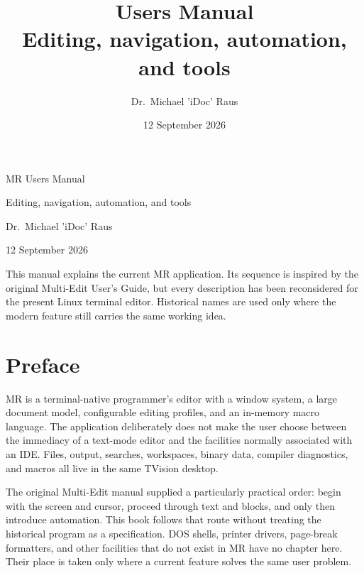 \documentclass[a4paper,10pt,twoside,openany]{book}
\title{\mr{} Users Manual\\\large Editing, navigation, automation, and tools}
\author{Dr.\ Michael 'iDoc' Raus}
\date{12 September 2026}
\newcommand{\mr}{\textsc{MR}}
\begin{document}
\frontmatter

\begin{titlepage}
\begin{center}
\vspace*{\fill}
{\LARGE \mr{} Users Manual\par}
\vspace{0.5\baselineskip}
{\large Editing, navigation, automation, and tools\par}
\vspace{3\baselineskip}
{\large Dr.\ Michael 'iDoc' Raus\par}
\vspace{2\baselineskip}
{\large 12 September 2026\par}
\end{center}

\vfill
\begin{minipage}{0.82\textwidth}
\small
This manual explains the current \mr{} application. Its sequence is inspired
by the original Multi-Edit User's Guide, but every description has been
reconsidered for the present Linux terminal editor. Historical names are used
only where the modern feature still carries the same working idea.
\end{minipage}
\vspace*{1.5cm}
\end{titlepage}

\chapter*{Preface}

\mr{} is a terminal-native programmer's editor with a window system, a large
document model, configurable editing profiles, and an in-memory macro
language. The application deliberately does not make the user choose between
the immediacy of a text-mode editor and the facilities normally associated
with an IDE. Files, output, searches, workspaces, binary data, compiler
diagnostics, and macros all live in the same TVision desktop.

The original Multi-Edit manual supplied a particularly practical order: begin
with the screen and cursor, proceed through text and blocks, and only then
introduce automation. This book follows that route without treating the
historical program as a specification. DOS shells, printer drivers, page-break
formatters, and other facilities that do not exist in \mr{} have no chapter
here. Their place is taken only where a current feature solves the same user
problem.
\end{document}
